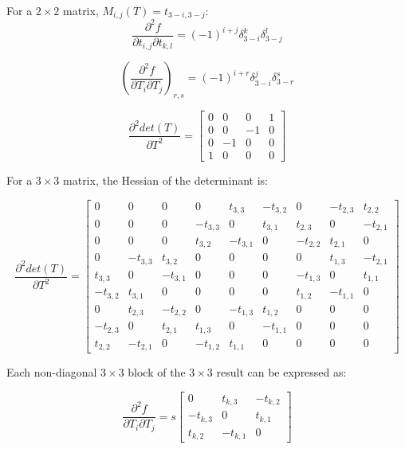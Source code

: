\documentclass{report}
\begin{document}
For a $2 \times 2$ matrix, $M_{i,j}(T) = t_{3-i,3-j}$:
\begin{equation}
\frac{\partial^2 f}{\partial t_{i,j} \partial t_{k,l}} = 
(-1)^{i+j} \delta_{3-i}^k \delta_{3-j}^l
\end{equation}

\begin{equation}
\left(\frac{\partial^2 f}{\partial T_i \partial T_j}\right)_{r,s} =
(-1)^{i+r} \delta_{3-i}^j \delta_{3-r}^s
\end{equation}

\begin{equation}
\frac{\partial^2 det(T)}{\partial T^2} =
\left[ \begin{array}{cccc}
0 & 0 & 0 & 1 \\
0 & 0 & -1 & 0 \\
0 & -1 & 0 & 0 \\
1 & 0 & 0 & 0 
\end{array} \right]
\end{equation}

For a $3 \times 3$ matrix, the Hessian of the determinant is:

\begin{equation}
\frac{\partial^2 det(T)}{\partial T^2} =
\left[ \begin{array}{ccccccccc}
 0 & 0 & 0 & 0 & t_{3,3} & -t_{3,2} & 0 & -t_{2,3} & t_{2,2} \\
 0 & 0 & 0 & -t_{3,3} & 0 & t_{3,1} & t_{2,3} & 0 & -t_{2,1} \\
 0 & 0 & 0 & t_{3,2} & -t_{3,1} & 0 & -t_{2,2} & t_{2,1} & 0 \\
 0 & -t_{3,3} & t_{3,2} & 0 & 0 & 0 & 0 & t_{1,3} & -t_{2,1} \\
 t_{3,3} & 0 & -t_{3,1} & 0 & 0 & 0 & -t_{1,3} & 0 & t_{1,1} \\
 -t_{3,2} & t_{3,1} & 0 & 0 & 0 & 0 & t_{1,2} & -t_{1,1} & 0 \\
 0 & t_{2,3} & -t_{2,2} & 0 & -t_{1,3} & t_{1,2} & 0 & 0 & 0 \\
 -t_{2,3} & 0 & t_{2,1} & t_{1,3} & 0 & -t_{1,1} & 0 & 0 & 0 \\
 t_{2,2} & -t_{2,1} & 0 & -t_{1,2} & t_{1,1} & 0 & 0 & 0 & 0
\end{array} \right]
\end{equation}

Each non-diagonal $3 \times 3$ block of the $3 \times 3$ result can be expressed as:

\begin{equation}
\frac{\partial^2 f}{\partial T_i \partial T_j}
 = s\left[\begin{array}{ccc}
0 & t_{k,3} & -t_{k,2} \\
-t_{k,3} & 0 & t_{k,1} \\
t_{k,2} & -t_{k,1} & 0 
\end{array}\right]\end{equation}
\end{document}
